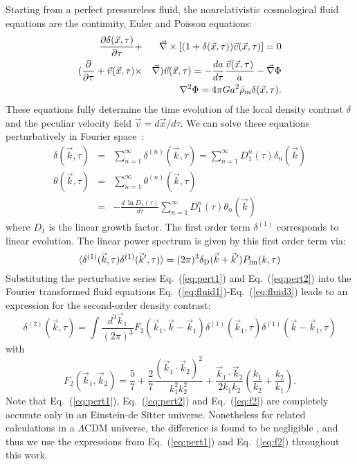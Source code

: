 \documentclass[prd,amsmath,amssymb,floatfix,superscriptaddress,nofootinbib,twocolumn]{revtex4-1}
\def\be{\begin{equation}}
\def\ee{\end{equation}}
\def\bea{\begin{eqnarray}}
\def\eea{\end{eqnarray}}
\newcommand{\vs}{\nonumber\\}
\newcommand{\vk}{\vec{k}}
\newcommand{\ec}[1]{Eq.~(\ref{eq:#1})}
\newcommand{\eql}[1]{\label{eq:#1}}
\begin{document}
\label{sec1}
Starting from a perfect pressureless fluid, the nonrelativistic cosmological fluid equations are the continuity, Euler and Poisson equations:
\bea
\frac{\partial \delta(\vec{x},\tau)}{\partial \tau} &+&\vec{\nabla}\times [(1+\delta(\vec{x},\tau))\vec{v}(\vec{x},\tau)] =0\eql{fluid1} \\
(\frac{\partial}{\partial \tau} +\vec{v}(\vec{x},\tau)&\times&\vec{\nabla})\vec{v}(\vec{x},\tau)=-\frac{da}{d\tau}\frac{\vec{v}(\vec{x},\tau)}{a}-\vec{\nabla}\Phi \eql{eulereq}\\
&&\nabla^2 \Phi = 4\pi G a^2 \bar{\rho}_{\rm m} \delta(\vec{x},\tau) .\eql{fluid3}
\eea
These equations fully determine the time evolution of the local density contrast $\delta$ and the peculiar velocity field $\vec{v}=d\vec{x}/d\tau$.
We can solve these equations perturbatively in Fourier space~\cite{Bernardeau:2002rev}:
\bea
{\delta}(\vk,\tau) &=&\sum_{n=1}^{\infty} {\delta}^{(n)}(\vk,\tau)=\sum_{n=1}^{\infty}D_1^{n}(\tau)\delta_{n}(\vk)  \eql{pert1}\\
{\theta}(\vk,\tau)&=&\sum_{n=1}^{\infty}{\theta}^{(n)}(\vk,\tau) \vs
&=&-\frac{d\,\ln D_1(\tau)}{d\tau}\sum_{n=1}^{\infty}D_1^{n}(\tau)\theta_{n}(\vk) \eql{pert2}
\eea
where $D_1$ is the linear growth factor. 
The first order term ${\delta}^{(1)}$ corresponds to linear evolution. The linear power spectrum is given by this first order term via:
\be 
\langle {\delta^{(1)}}(\vk,\tau){\delta^{(1)}}(\vk',\tau) \rangle =(2\pi)^3 \delta_{\rm D}(\vk+\vk')P_{\rm lin}(k,\tau) \eql{lin}
\ee 
Substituting the perturbative series \ec{pert1} and \ec{pert2} into the Fourier transformed fluid equations \ec{fluid1}-\ec{fluid3} leads to an expression for the second-order density contrast:
\be
{\delta}^{(2)}(\vk,\tau)=\int \frac{d^{3}\vk_{1}}{(2\pi)^3} F_2(\vk_1,\vk-\vk_1){\delta}^{(1)}(\vk_1,\tau) {\delta}^{(1)}(\vk-\vk_1,\tau) \eql{sorder} 
\ee
with 
\be
F_{2}(\vk_1,\vk_2)=\frac{5}{7}+\frac{2}{7}\frac{(\vk_1\cdot \vk_2)^2}{k_1^2 k_2^2}+\frac{\vk_1\cdot \vk_2}{2k_1k_2}(\frac{k_1}{k_2}+\frac{k_2}{k_1}).\eql{f2}
\ee
Note that \ec{pert1}, \ec{pert2} and \ec{f2} are completely accurate only in an Einstein-de Sitter universe. Nonetheless for related calculations in a $\Lambda$CDM universe, the difference is found to be negligible \cite{Takahashi:2008to}, and thus we use the expressions from \ec{pert1} and \ec{f2} throughout this work.\\
\end{document}
